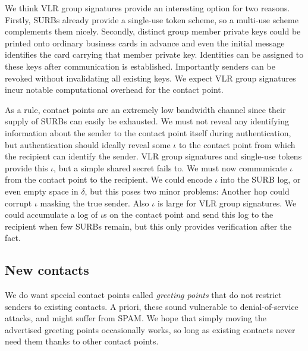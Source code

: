 We think VLR group signatures \cite{VLR} provide an interesting
option for two reasons.  Firstly, SURBs already provide a single-use
token scheme, so a multi-use scheme complements them nicely.  
Secondly, distinct group member private keys could be printed onto
ordinary business cards in advance and even the initial message
identifies the card carrying that member private key.  Identities
can be assigned to these keys after communication is established.  
Importantly senders can be revoked without invalidating all existing
keys.  We expect VLR group signatures incur notable computational
overhead for the contact point.  %

As a rule, contact points are an extremely low bandwidth channel
since their supply of SURBs can easily be exhausted.  We must not
reveal any identifying information about the sender to the contact 
point itself during authentication, but authentication should ideally
reveal some $\iota$ to the contact point from which the recipient
can identify the sender.  VLR group signatures and single-use tokens
provide this $\iota$, but a simple shared secret fails to.  We must
now communicate $\iota$ from the contact point to the recipient. 
We could encode $\iota$ into the SURB log, or even empty space in
$\delta$, but this poses two minor problems: 
 Another hop could corrupt $\iota$ masking the true sender.
 Also $\iota$ is large for VLR group signatures.  
We could accumulate a log of $\iota$s on the contact point and send
this log to the recipient when few SURBs remain, but this only
provides verification after the fact.



\subsection{New contacts}


We do want special contact points called {\em greeting points} that
do not restrict senders to existing contacts.  A priori, these sound
vulnerable to denial-of-service attacks, and might suffer from SPAM.
We hope that simply moving the advertised greeting points occasionally
works, so long as existing contacts never need them thanks to other
contact points.

